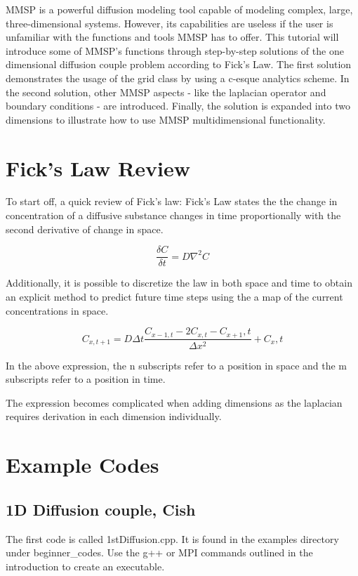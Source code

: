 \documentclass{article}
\begin{document}
MMSP is a powerful diffusion modeling tool capable of modeling complex, large, three-dimensional systems. However, its capabilities are useless if the user is unfamiliar with the functions and tools MMSP has to offer. This tutorial will introduce some of MMSP’s functions through step-by-step solutions of the one dimensional diffusion couple problem according to Fick’s Law.  The first solution demonstrates the usage of the grid class by using a c-esque analytics scheme.  In the second solution, other MMSP aspects - like the laplacian operator and boundary conditions - are introduced. Finally, the solution is expanded into two dimensions to illustrate how to use MMSP multidimensional functionality. 


\section{Fick's Law Review}

To start off, a quick review of Fick’s law:  Fick’s Law states the the change in concentration of a diffusive substance changes in time proportionally with the second derivative of change in space.

$$\frac{\delta C}{\delta t}=D\nabla ^2C$$

Additionally, it is possible to discretize the law in both space and time to obtain an explicit method to predict future time steps using the a map of the current concentrations in space. 

$$C_{x,t+1} = D\Delta t\frac{C_{x-1,t} - 2C_{x,t} - C_{x+1},t }{ \Delta x^2} + C_x,t $$

In the above expression, the n subscripts refer to a position in space and the m subscripts refer to a position in time.

The expression becomes complicated when adding dimensions as the laplacian requires derivation in each dimension individually.   


\section{Example Codes}
\label{sec:examples}

\subsection{1D Diffusion couple, Cish}

The first code is called 1stDiffusion.cpp.  It is found in the examples directory under beginner_codes. Use the g++ or MPI commands outlined in the introduction to create an executable.
\end{document}
